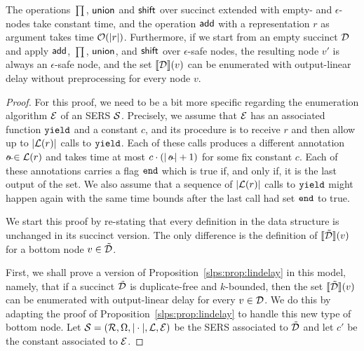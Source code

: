 	\begin{proposition}\label{slps:prop:ds-succ}
		The operations $\prod$, $\mathsf{union}$ and $\mathsf{shift}$ over succinct \dsabbrs{} extended with empty- and $\epsilon$-nodes take constant time, and the operation $\mathsf{add}$ with a representation $r$ as argument takes time $\mathcal{O}(|r|)$. Furthermore, if we start from an empty succinct \dsabbr{} $\mathcal{D}$ and apply $\mathsf{add}$, $\prod$, $\mathsf{union}$, and $\mathsf{shift}$ over $\epsilon$-safe nodes, the resulting node $v'$ is always an $\epsilon$-safe node, and the set ${\llbracket{\mathcal{D}}\rrbracket}(v)$ can be enumerated with output-linear delay without preprocessing for every node $v$.
	\end{proposition}
	\begin{proof}
		For this proof, we need to be a bit more specific regarding the enumeration algorithm $\mathcal{E}$ of an SERS $\mathcal{S}$. 
		Precisely, we assume that $\mathcal{E}$ has an associated function $\texttt{yield}$ and a constant $c$, and its procedure is to receive $r$ and then allow up to $|\mathcal{L}(r)|$ calls to $\texttt{yield}$. Each of these calls produces a different annotation $\oout\in \cL(r)$ and takes time at most $c\cdot (|\oout|+1)$ for some fix constant $c$. Each of these annotations carries a flag ${\tt end}$ which is true if, and only if, it is the last output of the set. We also assume that a sequence of $|\mathcal{L}(r)|$ calls to $\texttt{yield}$ might happen again with the same time bounds after the last call had set ${\tt end}$ to true.
		
		We start this proof by re-stating that every definition in the \dsabbr data structure is unchanged in its succinct version. The only difference is the definition of ${\llbracket{\tilde{\mathcal{D}}}\rrbracket}(v)$ for a bottom node $v\in\tilde{\mathcal{D}}$.
		
		First, we shall prove a version of Proposition~\ref{slps:prop:lindelay} in this model, namely, that if a succinct \dsabbr $\tilde{\mathcal{D}}$ is duplicate-free and $k$-bounded, then the set ${\llbracket{\tilde{\mathcal{D}}}\rrbracket}(v)$ can be enumerated with output-linear delay for every $v\in \mathcal{D}$. We do this by adapting the proof of Proposition~\ref{slps:prop:lindelay} to handle this new type of bottom node. Let $\mathcal{S} = (\mathcal{R}, \Omega, |\cdot |, \mathcal{L}, \mathcal{E})$ be the SERS associated to $\tilde{\mathcal{D}}$ and let $c'$ be the constant associated to $\mathcal{E}$. 


\end{proof}
